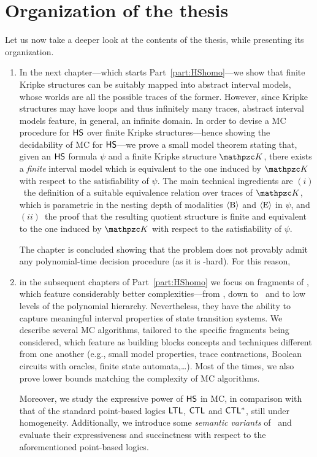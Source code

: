 \section{Organization of the thesis}
Let us now take a deeper look at the contents of the thesis, while presenting its organization.
\begin{enumerate}
    \item In the next chapter---which starts Part~\ref{part:HShomo}---we show that finite Kripke structures can be suitably mapped into
abstract interval models, 
whose worlds are all the possible traces of the former.
However, since Kripke structures may have loops and thus infinitely many traces, abstract interval models feature, in 
general, an infinite domain. 
In order to devise a MC procedure for $\text{\sffamily HS}$ over finite Kripke
structures---hence showing the decidability of MC for $\text{\sffamily HS}$---we prove a small model theorem stating that, given an $\text{\sffamily HS}$ 
formula $\psi$ and a finite Kripke structure $\Ku$, there exists a \emph{finite}
interval model which is equivalent to the one induced by $\Ku$ with respect 
to the satisfiability of $\psi$.
The main technical ingredients are $(i)$~the definition of a suitable equivalence relation 
over traces of $\Ku$, which is parametric in the nesting 
depth of modalities $\operatorname{\langle B\rangle}$ and $\operatorname{\langle E\rangle}$ in $\psi$, and $(ii)$~the proof that 
the resulting quotient structure is finite and equivalent to the one induced by 
$\Ku$ with respect to the satisfiability of $\psi$.

The chapter is concluded showing that the problem does not provably admit any polynomial-time decision procedure (as it is \EXPSPACE-hard). For this reason, 
\item
in the subsequent chapters of Part~\ref{part:HShomo} we focus on fragments of \HS , which 
feature considerably better complexities---from \EXPSPACE, down to \Psp\ and to low levels of the polynomial hierarchy. Nevertheless, they have the ability to capture meaningful interval properties of state transition systems.
We describe several MC algorithms, tailored to the specific fragments being considered, which feature as building blocks concepts and techniques different from one another (e.g., small model properties, trace contractions, Boolean circuits with oracles, finite state automata,\ldots). Most of the times, we also prove lower bounds matching the complexity of MC algorithms.

Moreover, we study the expressive power of $\text{\sffamily HS}$ in MC, in comparison with that of the standard point-based logics $\text{\sffamily LTL}$, $\text{\sffamily CTL}$ and $\text{\sffamily CTL$^{*}$}$, still under homogeneity.
Additionally, we introduce some \emph{semantic variants} of \HS\  and evaluate their expressiveness and succinctness with respect to the aforementioned point-based logics.


\end{enumerate}
